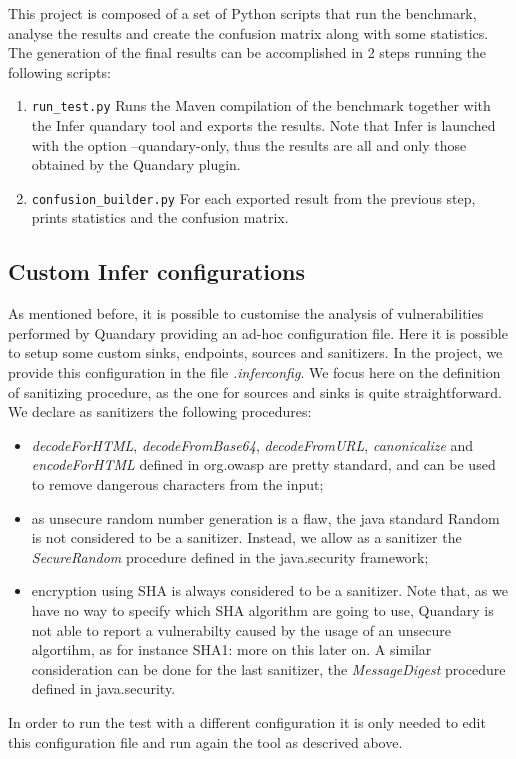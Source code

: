 \documentclass[../Report.tex]{subfiles}
\begin{document}
This project is composed of a set of Python scripts that run the benchmark, analyse the results and create the confusion matrix along with some statistics. 
The generation of the final results can be accomplished in 2 steps running the following scripts:

\begin{enumerate}
	\item \texttt{run\_test.py} Runs the Maven compilation of the benchmark together with the
	Infer quandary tool and exports the results. Note that Infer is launched with the option
	--quandary-only, thus the results are all and only those obtained by the Quandary plugin. 
	\item \texttt{confusion\_builder.py} For each exported result from the previous step, prints statistics and the confusion matrix.
\end{enumerate}

\subsection{Custom Infer configurations}
As mentioned before, it is possible to customise the analysis of vulnerabilities performed by Quandary providing an ad-hoc configuration file. Here it is possible to setup some custom sinks, endpoints, sources and sanitizers. In the project, we provide this configuration in the file \emph{.inferconfig}. We focus here on the definition of sanitizing procedure, as the one for sources and sinks is quite straightforward. \\
We declare as sanitizers the following procedures:
\begin{itemize}
	\item \emph{decodeForHTML}, \emph{decodeFromBase64}, \emph{decodeFromURL},
	\emph{canonicalize} and \emph{encodeForHTML} defined in org.owasp are
	pretty standard, and can be used to remove dangerous characters from the 
	input;
	\item as unsecure random number generation is a flaw, the java standard Random is not
	considered to be a sanitizer. Instead, we allow as a sanitizer the \emph{SecureRandom}
	procedure defined in the java.security framework;
	\item encryption using SHA is always considered to be a sanitizer. Note that, as we have
	no way to specify which SHA algorithm are going to use, Quandary is not able to report
	a vulnerabilty caused by the usage of an unsecure algortihm, as for instance SHA1: more
	on this later on. A similar consideration can be done for the last sanitizer, the 
	\emph{MessageDigest} procedure defined in java.security.
\end{itemize}
In order to run the test with a different configuration it is only needed to edit this configuration file and run again the tool as descrived above.
\end{document}
